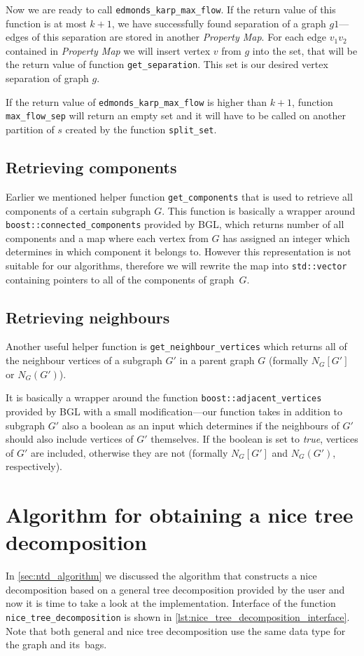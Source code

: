\documentclass[thesis=B,english]{FITthesis}[2019/03/21]
\begin{document}
Now we are ready to call \texttt{edmonds\_karp\_max\_flow}. If the return value of this function is at most $k+1$, we have successfully found separation of a graph $g1$---edges of this separation are stored in another \emph{Property Map}. For each edge $v_1v_2$ contained in \emph{Property Map} we will insert vertex $v$ from $g$ into the set, that will be the return value of function \texttt{get\_separation}. This set is our desired vertex separation of graph $g$.

If the return value of \texttt{edmonds\_karp\_max\_flow} is higher than $k+1$, function \texttt{max\_flow\_sep} will return an empty set and it will have to be called on another partition of $s$ created by the function \texttt{split\_set}.

\subsection{Retrieving components}
Earlier we mentioned helper function \texttt{get\_components} that is used to retrieve all components of a certain subgraph $G$. This function is basically a wrapper around \texttt{boost::connected\_components} provided by BGL, which returns number of all components and a map where each vertex from $G$ has assigned an integer which determines in which component it belongs to. However this representation is not suitable for our algorithms, therefore we will rewrite the map into \texttt{std::vector} containing pointers to all of the components of graph~$G$.

\subsection{Retrieving neighbours}
Another useful helper function is \texttt{get\_neighbour\_vertices} which returns all of the neighbour vertices of a subgraph $G'$ in a parent graph $G$ (formally $N_G[G']$ or $N_G(G')$).

It is basically a wrapper around the function \texttt{boost::adjacent\_vertices} provided by BGL with a small modification---our function takes in addition to subgraph $G'$ also a boolean as an input which determines if the neighbours of $G'$ should also include vertices of $G'$ themselves. If the boolean is set to \emph{true}, vertices of $G'$ are included, otherwise they are not (formally $N_G[G']$ and $N_G(G')$, respectively).

\section{Algorithm for obtaining a nice tree decomposition}\label{sec:ntd_implementation}
In \autoref{sec:ntd_algorithm} we discussed the algorithm that constructs a nice decomposition based on a general tree decomposition provided by the user and now it is time to take a look at the implementation. Interface of the function \texttt{nice\_tree\_decomposition} is shown in \autoref{lst:nice_tree_decomposition_interface}. Note that both general and nice tree decomposition use the same data type for the graph and its~bags.
\end{document}
